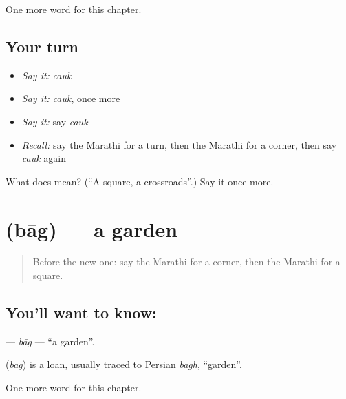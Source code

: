 \begin{grammarlens}[title={What you've built}]
One more word for this chapter.
\end{grammarlens}

\subsection*{Your turn}
\begin{itemize}
\raggedright
  \item \emph{Say it:} \emph{cauk}
  \item \emph{Say it:} \emph{cauk}, once more
  \item \emph{Say it:} say \emph{cauk}
  \item \emph{Recall:} say the Marathi for a turn, then the Marathi for a corner, then say \emph{cauk} again
\end{itemize}

\begin{tcolorbox}[breakable,colback=teal!4,colframe=teal!35!black,title={Before you move on}]
What does  mean? (\textquotedblleft{}A square, a crossroads\textquotedblright{}.) Say it once more.
\end{tcolorbox}
\section[\texorpdfstring{\mr{बाग} (bāg)}{बाग (bāg)}]{ (bāg) — a garden}

\label{lesson:MR-C128-bag}



\begin{quote}
Before the new one: say the Marathi for a corner, then the Marathi for a square.
\end{quote}

\subsection*{You'll want to know: }
\textbf{} — \emph{bāg} — \textquotedblleft{}a garden\textquotedblright{}.

\begin{cousinweb}
\textbf{} (\emph{bāg}) is a loan, usually traced to Persian \emph{bāgh}, \textquotedblleft{}garden\textquotedblright{}.
\end{cousinweb}

\begin{grammarlens}[title={What you've built}]
One more word for this chapter.
\end{grammarlens}

